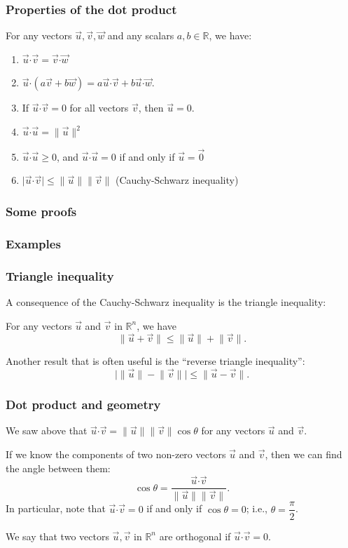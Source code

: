 \documentclass[11pt,t]{beamer}
\newcommand{\R}{\mathbb{R}}
\newcommand{\abs}[1]{\lvert #1\rvert}
\newcommand{\len}[1]{\lVert #1\rVert}
\newcommand{\dotp}{\boldsymbol{\cdot}}
\begin{document}
\begin{frame}
\frametitle{Properties of the dot product}
\begin{theorem}
For any vectors $\vec{u},\vec{v},\vec{w}$ and any scalars $a,b\in\R$, we have:
\begin{enumerate}
\item $\vec{u}\dotp\vec{v} = \vec{v}\dotp\vec{w}$
\item $\vec{u}\dotp(a\vec{v}+b\vec{w}) = a\vec{u}\dotp\vec{v}+b\vec{u}\dotp\vec{w}$.
\item If $\vec{u}\dotp\vec{v} = 0$ for \alert{all} vectors $\vec{v}$, then $\vec{u}=0$.
\item $\vec{u}\dotp\vec{u} = \len{\vec{u}}^2$
\item $\vec{u}\dotp\vec{u}\geq 0$, and $\vec{u}\dotp\vec{u}=0$ if and only if $\vec{u}=\vec{0}$
\item $\abs{\vec{u}\dotp\vec{v}}\leq \len{\vec{u}}\len{\vec{v}}$ (Cauchy-Schwarz inequality)
\end{enumerate}
\end{theorem}
\end{frame}
\begin{frame}
\frametitle{Some proofs}

\end{frame}
\begin{frame}
\frametitle{Examples}

\end{frame}
\begin{frame}
\frametitle{Triangle inequality}

A consequence of the Cauchy-Schwarz inequality is the \alert{triangle inequality}:
\begin{theorem}
For any vectors $\vec{u}$ and $\vec{v}$ in $\R^n$, we have
\[
\len{\vec{u}+\vec{v}}\leq \len{\vec{u}}+\len{\vec{v}}.
\]
\end{theorem}
Another result that is often useful is the ``reverse triangle inequality'':
\[
\abs{\len{\vec{u}}-\len{\vec{v}}} \leq \len{\vec{u}-\vec{v}}.
\]
\end{frame}
\begin{frame}
\frametitle{Dot product and geometry}
We saw above that $\vec{u}\dotp\vec{v} = \len{\vec{u}}\len{\vec{v}}\cos\theta$ for any vectors $\vec{u}$ and $\vec{v}$.

If we know the components of two non-zero vectors $\vec{u}$ and $\vec{v}$, then we can find the angle between them:
\[
\cos\theta = \frac{\vec{u}\dotp\vec{v}}{\len{\vec{u}}\len{\vec{v}}}.
\]
In particular, note that $\vec{u}\dotp\vec{v} = 0$ if and only if $\cos\theta = 0$; i.e.,  $\theta = \dfrac{\pi}{2}$.
\begin{definition}
We say that two vectors $\vec{u},\vec{v}$ in $\R^n$ are \alert{orthogonal} if $\vec{u}\dotp\vec{v} = 0$.
\end{definition}
\end{frame}
\end{document}
